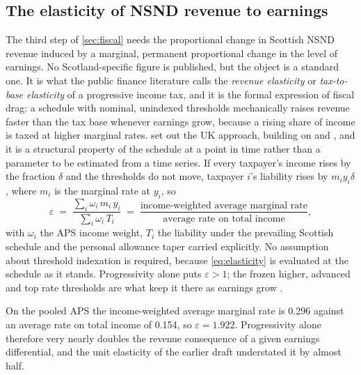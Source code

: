 \subsection{The elasticity of NSND revenue to earnings}\label{app:elasticity}

The third step of \cref{sec:fiscal} needs the proportional change in Scottish NSND revenue induced by a marginal, permanent proportional change in the level of earnings. No Scotland-specific figure is published, but the object is a standard one. It is what the public finance literature calls the \emph{revenue elasticity} or \emph{tax-to-base elasticity} of a progressive income tax, and it is the formal expression of fiscal drag: a schedule with nominal, unindexed thresholds mechanically raises revenue faster than the tax base whenever earnings grow, because a rising share of income is taxed at higher marginal rates. \citet{creedy2004} set out the UK approach, building on \citet{creedy2002} and \citet{johnson1989}, and it is a structural property of the schedule at a point in time rather than a parameter to be estimated from a time series. If every taxpayer's income rises by the fraction $\delta$ and the thresholds do not move, taxpayer $i$'s liability rises by $m_i y_i \delta$, where $m_i$ is the marginal rate at $y_i$, so
\begin{equation}\label{eq:elasticity}
\varepsilon \;=\;
\frac{\sum_i \omega_i\, m_i\, y_i}{\sum_i \omega_i\, T_i}
\;=\;
\frac{\text{income-weighted average marginal rate}}
     {\text{average rate on total income}},
\end{equation}
with $\omega_i$ the APS income weight, $T_i$ the liability under the prevailing Scottish schedule and the personal allowance taper carried explicitly. No assumption about threshold indexation is required, because \cref{eq:elasticity} is evaluated at the schedule as it stands. Progressivity alone puts $\varepsilon > 1$; the frozen higher, advanced and top rate thresholds are what keep it there as earnings grow \citep{sgreadyreckoner2026}.

On the pooled APS the income-weighted average marginal rate is 0.296 against an average rate on total income of 0.154, so $\varepsilon = 1.922$. Progressivity alone therefore very nearly doubles the revenue consequence of a given earnings differential, and the unit elasticity of the earlier draft understated it by almost half.

